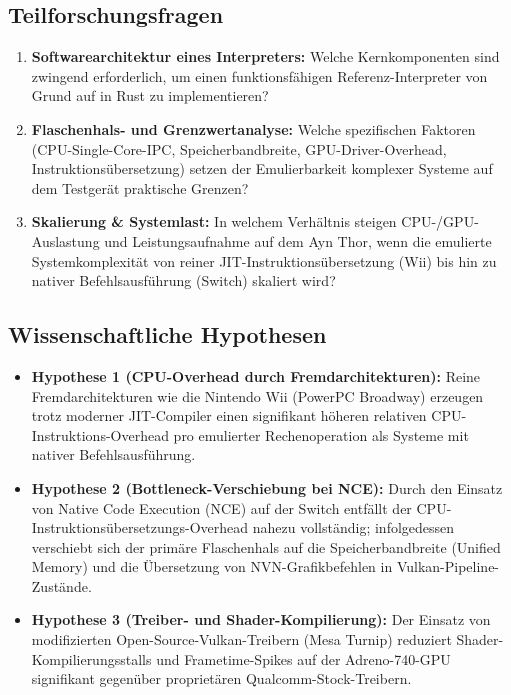 \documentclass[12pt,a4paper]{scrartcl}
\begin{document}
\subsection{Teilforschungsfragen}
\begin{enumerate}[leftmargin=1.8em]
    \item \textbf{Softwarearchitektur eines Interpreters:} Welche Kernkomponenten sind zwingend erforderlich, um einen funktionsfähigen Referenz-Interpreter von Grund auf in Rust zu implementieren?
    \item \textbf{Flaschenhals- und Grenzwertanalyse:} Welche spezifischen Faktoren (CPU-Single-Core-IPC, Speicherbandbreite, GPU-Driver-Overhead, Instruktionsübersetzung) setzen der Emulierbarkeit komplexer Systeme auf dem Testgerät praktische Grenzen?
    \item \textbf{Skalierung \& Systemlast:} In welchem Verhältnis steigen CPU-/GPU-Auslastung und Leistungsaufnahme auf dem Ayn Thor, wenn die emulierte Systemkomplexität von reiner JIT-Instruktionsübersetzung (Wii) bis hin zu nativer Befehlsausführung (Switch) skaliert wird?
\end{enumerate}

\subsection{Wissenschaftliche Hypothesen}
\begin{itemize}[leftmargin=1.8em]
    \item \textbf{Hypothese 1 (CPU-Overhead durch Fremdarchitekturen):} Reine Fremdarchitekturen wie die Nintendo Wii (PowerPC Broadway) erzeugen trotz moderner JIT-Compiler einen signifikant höheren relativen CPU-Instruktions-Overhead pro emulierter Rechenoperation als Systeme mit nativer Befehlsausführung.
    \item \textbf{Hypothese 2 (Bottleneck-Verschiebung bei NCE):} Durch den Einsatz von Native Code Execution (NCE) auf der Switch entfällt der CPU-Instruktionsübersetzungs-Overhead nahezu vollständig; infolgedessen verschiebt sich der primäre Flaschenhals auf die Speicherbandbreite (Unified Memory) und die Übersetzung von NVN-Grafikbefehlen in Vulkan-Pipeline-Zustände.
    \item \textbf{Hypothese 3 (Treiber- und Shader-Kompilierung):} Der Einsatz von modifizierten Open-Source-Vulkan-Treibern (Mesa Turnip) reduziert Shader-Kompilierungsstalls und Frametime-Spikes auf der Adreno-740-GPU signifikant gegenüber proprietären Qualcomm-Stock-Treibern.
\end{itemize}
\end{document}
